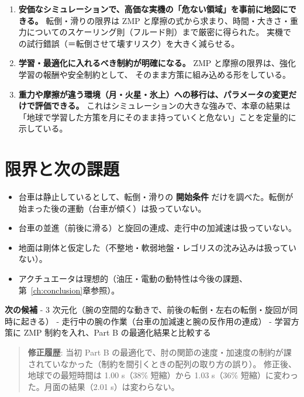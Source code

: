 \begin{enumerate}
\def\labelenumi{\arabic{enumi}.}
\tightlist
\item
  \textbf{安価なシミュレーションで、高価な実機の「危ない領域」を事前に地図にできる。} 転倒・滑りの限界は ZMP と摩擦の式から求まり、時間・大きさ・重力についてのスケーリング則（フルード則）まで厳密に得られた。 実機での試行錯誤（＝転倒させて壊すリスク）を大きく減らせる。
\item
  \textbf{学習・最適化に入れるべき制約が明確になる。} ZMP と摩擦の限界は、強化学習の報酬や安全制約として、 そのまま方策に組み込める形をしている。
\item
  \textbf{重力や摩擦が違う環境（月・火星・氷上）への移行は、パラメータの変更だけで評価できる。} これはシミュレーションの大きな強みで、本章の結果は「地球で学習した方策を月にそのまま持っていくと危ない」ことを定量的に示している。
\end{enumerate}

\section{限界と次の課題}

\begin{itemize}
\tightlist
\item
  台車は静止しているとして、転倒・滑りの \textbf{開始条件} だけを調べた。転倒が始まった後の運動（台車が傾く）は扱っていない。
\item
  台車の並進（前後に滑る）と旋回の連成、走行中の加減速は扱っていない。
\item
  地面は剛体と仮定した（不整地・軟弱地盤・レゴリスの沈み込みは扱っていない）。
\item
  アクチュエータは理想的（油圧・電動の動特性は今後の課題、第~\ref{ch:conclusion}章参照）。
\end{itemize}

\textbf{次の候補} - 3 次元化（腕の空間的な動きで、前後の転倒・左右の転倒・旋回が同時に起きる） - 走行中の腕の作業（台車の加減速と腕の反作用の連成） - 学習方策に ZMP 制約を入れ、Part B の最適化結果と比較する

\begin{quote}
\textbf{修正履歴}: 当初 Part B の最適化で、肘の関節の速度・加速度の制約が課されていなかった（制約を間引くときの配列の取り方の誤り）。 修正後、地球での最短時間は 1.00 s（38\% 短縮）から 1.03 s（36\% 短縮）に変わった。月面の結果（2.01 s）は変わらない。
\end{quote}

